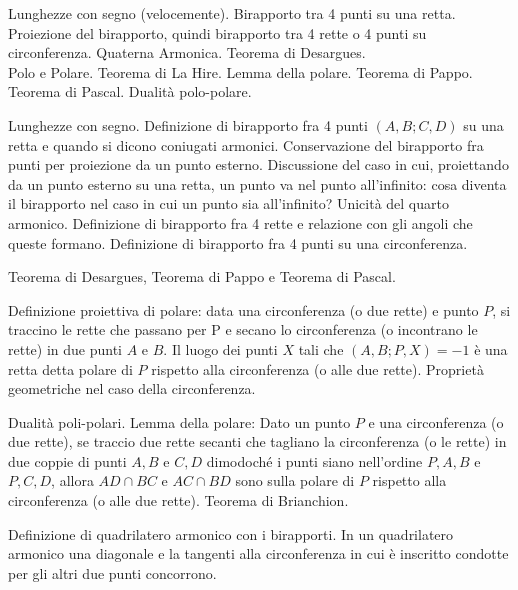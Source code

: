 \begin{short}
 Lunghezze con segno (velocemente). Birapporto tra 4 punti su una retta. Proiezione del birapporto, quindi birapporto tra 4 rette o 4 punti su circonferenza. Quaterna Armonica. Teorema di Desargues.\\
 Polo e Polare. Teorema di La Hire. Lemma della polare. Teorema di Pappo. Teorema di Pascal. Dualità polo-polare. 
\end{short}

Lunghezze con segno. Definizione di birapporto fra 4 punti $(A,B;C,D)$ su una retta e quando si dicono coniugati armonici. Conservazione del birapporto fra punti per proiezione da un punto esterno. Discussione del caso in cui, proiettando da un punto esterno su una retta, un punto va nel punto all'infinito: cosa diventa il birapporto nel caso in cui un punto sia all'infinito? Unicità del quarto armonico. 
Definizione di birapporto fra 4 rette e relazione con gli angoli che queste formano. Definizione di birapporto fra 4 punti su una circonferenza.

Teorema di Desargues, Teorema di Pappo e Teorema di Pascal.


\vspace{0.5cm}

Definizione proiettiva di polare: data una circonferenza (o due rette) e punto $P$, si traccino le rette che passano per P e secano lo circonferenza (o incontrano le rette) in due punti $A$ e $B$. Il luogo dei punti $X$ tali che $(A,B;P,X)=-1$ è una retta detta polare di $P$ rispetto alla circonferenza (o alle due rette).  Proprietà geometriche nel caso della circonferenza.

Dualità poli-polari. Lemma della polare: Dato un punto $P$ e una circonferenza (o due rette), se traccio due rette secanti che tagliano la circonferenza (o le rette) in due coppie di punti $A,B$ e $C,D$ dimodoché i punti siano nell'ordine $P,A,B$ e $P,C,D$, allora $AD\cap BC$ e $AC\cap BD$ sono sulla polare di $P$ rispetto alla circonferenza (o alle due rette).  Teorema di Brianchion.

Definizione di quadrilatero armonico con i birapporti. In un quadrilatero armonico una diagonale e la tangenti alla circonferenza in cui è inscritto condotte per gli altri due punti concorrono.


